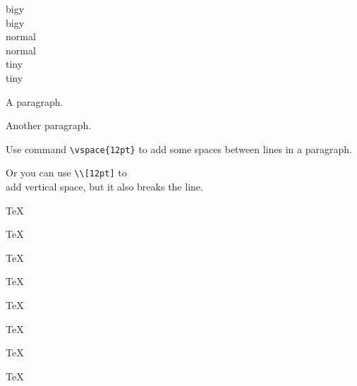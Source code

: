 \documentclass[12pt]{ctexrep}
\begin{document}
{\Large big\hspace{1em}y}\\
{\Large big\quad y}\\
nor\hspace{2em}mal\\
nor\qquad mal\\
{\tiny tin\hspace{1em}y}\\
{\tiny tin\quad y}


A paragraph.

\vspace{2ex}
Another paragraph.



Use command \verb|\vspace{12pt}|
to add \vspace{12pt} some spaces
between lines in a paragraph.

Or you can use \verb|\\[12pt]|
to \\[12pt] add vertical space,
but it also breaks the line.


\parbox[t]{3em}{TeX\par TeX}
\parbox[t]{3em}{TeX\par\smallskip TeX}
\parbox[t]{3em}{TeX\par\medskip TeX}
\parbox[t]{3em}{TeX\par\bigskip TeX}
\end{document}
